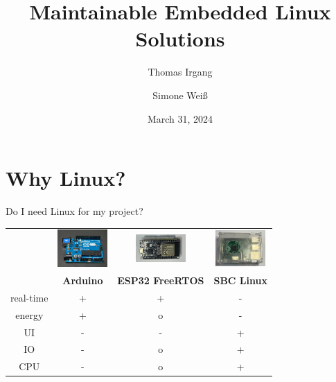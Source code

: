 \documentclass{beamer}
\title{Maintainable Embedded Linux Solutions}
\author{Thomas Irgang \and Simone Weiß}
\institute{EASTERHEGG 2024 - RABBIT PROTOTYPING}
\date{March 31, 2024}
\begin{document}
\begin{frame}
    \titlepage
\end{frame}

\section{Why Linux?}

\begin{frame}{Do I need Linux for my project?}
	\begin{tabular}{cccc}
	&\includegraphics[width=1.9cm]{assets/Pixabay_Arduino_integrated-circuit-441289_1280.jpg} &
	\includegraphics[width=1.9cm]{assets/ESP32.png} & 
	\includegraphics[width=1.9cm]{assets/Raspberry_Pi.png} \\
	&\textbf{Arduino} & \textbf{ESP32 FreeRTOS} & \textbf{SBC Linux} \\
	real-time & + &  + & - \\
	energy & + & o & - \\
	UI & - & - & + \\
	IO & - & o & + \\
	CPU & - & o & + \\
	\end{tabular}
\end{frame}
\end{document}
